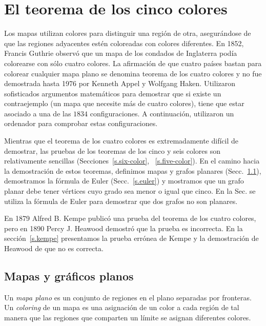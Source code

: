 
\chapter{El teorema de los cinco colores}\label{c.five}


Los mapas utilizan colores para distinguir una región de otra, asegurándose de que las regiones adyacentes estén coloreadas con colores diferentes. En 1852, Francis Guthrie observó que un mapa de los condados de Inglaterra podía colorearse con sólo cuatro colores. La afirmación de que cuatro países bastan para colorear cualquier mapa plano se denomina teorema de los cuatro colores y no fue demostrada hasta 1976 por Kenneth Appel y Wolfgang Haken. Utilizaron sofisticados argumentos matemáticos para demostrar que si existe un contraejemplo (un mapa que necesite más de cuatro colores), tiene que estar asociado a una de las $1834$ configuraciones. A continuación, utilizaron un ordenador para comprobar estas configuraciones.

Mientras que el teorema de los cuatro colores es extremadamente difícil de demostrar, las pruebas de los teoremas de los cinco y seis colores son relativamente sencillas (Secciones~\ref{s.six-color}, ~\ref{s.five-color}). En el camino hacia la demostración de estos teoremas, definimos mapas y grafos planares (Secc.~\ref{s.planar}), demostramos la fórmula de Euler (Secc.~\ref{s.euler}) y mostramos que un grafo planar debe tener vértices cuyo grado sea menor o igual que cinco. En la Sec. se utiliza la fórmula de Euler para demostrar que dos grafos no son planares.

En 1879 Alfred B. Kempe publicó una prueba del teorema de los cuatro colores, pero en 1890 Percy J. Heawood demostró que la prueba es incorrecta. En la sección~\ref{s.kempe} presentamos la prueba errónea de Kempe y la demostración de Heawood de que no es correcta.


\section{Mapas y gráficos planos}\label{s.planar}

\begin{definition}
Un \textit{mapa plano} es un conjunto de regiones en el plano separadas por fronteras. Un \textit{coloring} de un mapa es una asignación de un color a cada región de tal manera que las regiones que comparten un límite se asignan diferentes colores.
\end{definition}

